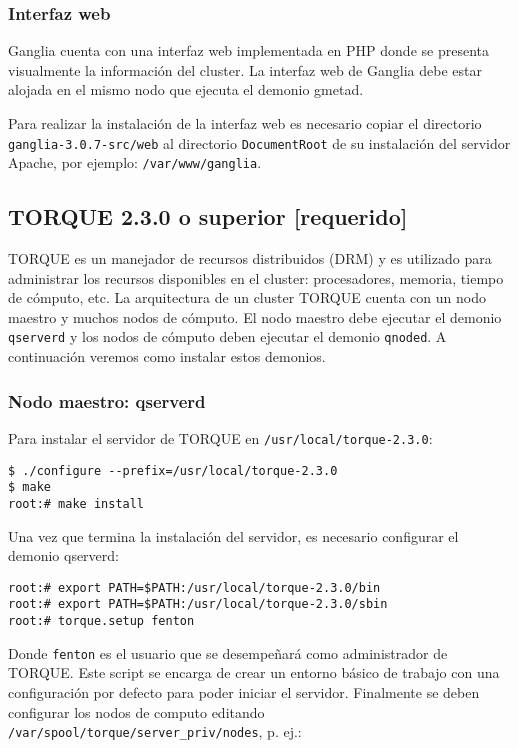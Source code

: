 \documentclass[a4paper,10pt,spanish]{article}
\begin{document}
\subsubsection{Interfaz web}

Ganglia cuenta con una interfaz web implementada en PHP donde se presenta visualmente la informaci\'{o}n del cluster. La interfaz web de Ganglia debe estar alojada en el mismo nodo que ejecuta el demonio gmetad.

Para realizar la instalaci\'{o}n de la interfaz web es necesario copiar el directorio \mbox{\texttt{ganglia-3.0.7-src/web}} al directorio \texttt{DocumentRoot} de su instalaci\'{o}n del servidor Apache, por ejemplo: \mbox{\texttt{/var/www/ganglia}}.

\subsection{TORQUE 2.3.0 o superior \small{[requerido]}}

TORQUE\cite{torque} es un manejador de recursos distribuidos (DRM) y es utilizado para administrar los recursos disponibles en el cluster: procesadores, memoria, tiempo de c\'{o}mputo, etc. La arquitectura de un cluster TORQUE cuenta con un nodo maestro y muchos nodos de c\'{o}mputo. El nodo maestro debe ejecutar el demonio \texttt{qserverd} y los nodos de c\'{o}mputo deben ejecutar el demonio \texttt{qnoded}. A continuaci\'{o}n veremos como instalar estos demonios.

\subsubsection{Nodo maestro: qserverd}

Para instalar el servidor de TORQUE en \mbox{\texttt{/usr/local/torque-2.3.0}}:

\begin{verbatim}
$ ./configure --prefix=/usr/local/torque-2.3.0 
$ make 
root:# make install
\end{verbatim}

Una vez que termina la instalaci\'{o}n del servidor, es necesario configurar el demonio qserverd:

\begin{verbatim}
root:# export PATH=$PATH:/usr/local/torque-2.3.0/bin
root:# export PATH=$PATH:/usr/local/torque-2.3.0/sbin
root:# torque.setup fenton
\end{verbatim}

Donde \mbox{\texttt{fenton}} es el usuario que se desempe\~{n}ar\'{a} como administrador de TORQUE. Este script se encarga de crear un entorno b\'{a}sico de trabajo con una configuraci\'{o}n por defecto para poder iniciar el servidor. Finalmente se deben configurar los nodos de computo editando \mbox{\texttt{/var/spool/torque/server\_priv/nodes}}, p. ej.:
\end{document}
